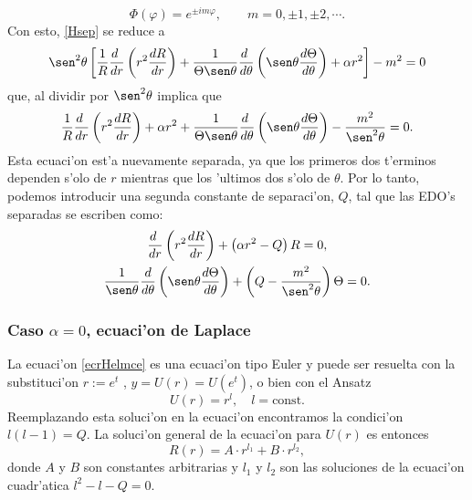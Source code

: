 \begin{equation}\label{Phim}
\Phi (\varphi) = e^{\pm im\varphi}, \qquad m=0,\pm 1,\pm 2, \cdots .
\end{equation}
Con esto, \eqref{Hsep} se reduce a
\begin{equation}
\sen^2\theta\left[\frac{1}{R}\frac{d\ }{dr}\left(r^2\frac{dR}{dr}\right) +
\frac{1}{\Theta\sen\theta}\frac{d\ }{d\theta}\left(\sen\theta\frac{
d\Theta}{d\theta}\right) +\alpha r^2\right]-m^2 = 0
 \end{equation}
que, al dividir por $\sen^2\theta$ implica que
\begin{equation}
\frac{1}{R}\frac{d\ }{dr}\left(r^2\frac{dR}{dr}\right)+\alpha r^2
+\frac{1}{\Theta\sen\theta}\frac{d\ }{d\theta}\left(\sen\theta\frac{
d\Theta}{d\theta}\right) -\frac{m^2}{\sen^2\theta} = 0.
 \end{equation}
Esta ecuaci'on est'a nuevamente separada, ya que los primeros dos t'erminos dependen s'olo de $r$ mientras que los 'ultimos dos s'olo de $\theta$. Por lo tanto, podemos introducir una segunda constante de separaci'on, $Q$, tal que las EDO's separadas se escriben como:
\begin{gather}
\frac{d\ }{dr}\left(r^2\frac{dR}{dr}\right)+\left(\alpha r^2-Q\right)R=0, \label{ecrHelmce}\\
\frac{1}{\sen\theta}\frac{d}{d\theta}\left(\sen\theta\frac{d\Theta}{d\theta}\right)
+\left(Q-\frac{m^2}{\sen^2\theta}\right) \Theta = 0. \label{ecThHelm}
\end{gather}

\subsubsection{Caso $\alpha=0$, ecuaci'on de Laplace}
 La ecuaci'on \eqref{ecrHelmce} es una ecuaci'on tipo Euler y puede ser resuelta con la
substituci'on $r:=e^t$ , $y=U(r)=U(e^t)$, o bien con el Ansatz
 \begin{equation}
  U(r) = r^l,\quad l=\text{const.}
\end{equation}
  Reemplazando esta soluci'on en la ecuaci'on encontramos la condici'on
 $l(l-1)=Q$. La soluci'on general de la ecuaci'on para $U(r)$ es entonces
\begin{equation}
 R(r) = A\cdot r^{l_1} + B\cdot r^{l_2},\label{loes2}
\end{equation}
donde $A$ y $B$ son constantes arbitrarias y $l_1$ y $l_2$ son las soluciones de la ecuaci'on cuadr'atica $l^2-l-Q=0$. 


